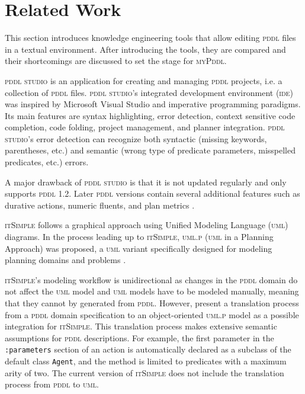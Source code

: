 \documentclass[runningheads]{llncs}
\newcommand{\mypddl}{\textsc{myPddl}\xspace}
\newcommand{\pddlstudio}{\textsc{pddl studio}\xspace}
\newcommand{\itsimple}{\textsc{itSimple}\xspace}
\newcommand{\pddl}{\textsc{pddl}\xspace}
\newcommand{\uml}{\textsc{uml}\xspace}
\newcommand{\ide}{\textsc{ide}\xspace}
\begin{document}
\section{Related Work}
\label{sec:related-work}

This section introduces knowledge engineering tools that allow editing
\textsc{pddl} files in a textual environment. After introducing the
tools, they are compared and their shortcomings are discussed to set
the stage for \mypddl.

\pddlstudio \cite{plch2012inspect} is an application for creating and
managing \pddl projects, i.e. a collection of \pddl
files. \pddlstudio 's integrated development environment (\ide) was
inspired by Microsoft Visual Studio and imperative programming
paradigms. Its main features are syntax highlighting, error detection,
context sensitive code completion, code folding, project management,
and planner integration. \pddlstudio 's error detection can recognize
both syntactic (missing keywords, parentheses, etc.) and semantic
(wrong type of predicate parameters, misspelled predicates, etc.)
errors.

A major drawback of \pddlstudio is that it is not updated regularly
and only supports \pddl 1.2. Later \pddl versions contain several
additional features such as durative actions, numeric fluents, and
plan metrics \cite{edelkamp2004pddl2}.

\itsimple \cite{vaquero2005itsimple} follows a graphical approach
using Unified Modeling Language (\uml) diagrams. In the process
leading up to \itsimple, \textsc{uml.p} (\uml in a Planning Approach)
was proposed, a \uml variant specifically designed for modeling
planning domains and problems \cite{vaquero2006use}.

\itsimple's modeling workflow is unidirectional as changes in the
\pddl domain do not affect the \uml model and \uml models have to be
modeled manually, meaning that they cannot by generated from
\pddl. However, \cite{tonidandel2006reading} present a translation
process from a \pddl domain specification to an object-oriented
\textsc{uml.p} model as a possible integration for \itsimple. This
translation process makes extensive semantic assumptions for \pddl
descriptions. For example, the first parameter in the
\texttt{:parameters} section of an action is automatically declared as
a subclass of the default class \texttt{Agent}, and the method is
limited to predicates with a maximum arity of two. The current
version of \itsimple does not include the translation process from
\pddl to \uml.
\end{document}
